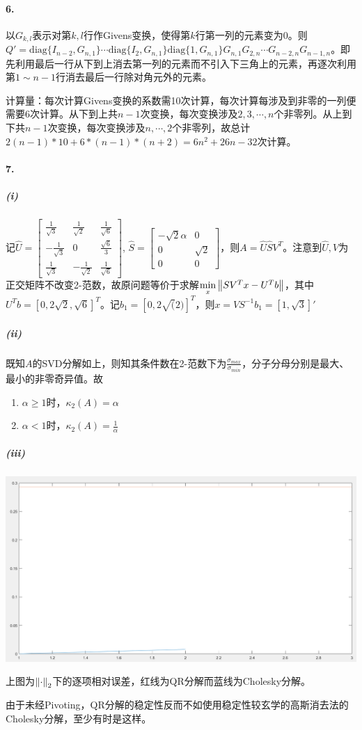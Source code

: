 \documentclass{ctexart}
\begin{document}
\paragraph{6.}
以$G_{k,l}$表示对第$k,l$行作Givens变换，使得第$k$行第一列的元素变为$0$。则$Q'=\mathrm{diag}\{I_{n-2},G_{n,1}\}\cdots\mathrm{diag}\{I_2,G_{n,1}\}\mathrm{diag}\{1,G_{n,1}\}G_{n,1}G_{2,n}\cdots G_{n-2,n}G_{n-1,n}$。即先利用最后一行从下到上消去第一列的元素而不引入下三角上的元素，再逐次利用第$1\sim n-1$行消去最后一行除对角元外的元素。

计算量：每次计算Givens变换的系数需10次计算，每次计算每涉及到非零的一列便需要6次计算。从下到上共$n-1$次变换，每次变换涉及$2,3,\cdots,n$个非零列。从上到下共$n-1$次变换，每次变换涉及$n,\cdots,2$个非零列，故总计$2(n-1)*10+6*(n-1)*(n+2)=6n^2+26n-32$次计算。


\paragraph{7.}
\subparagraph{(i)}
记$\hat{U}=
\begin{bmatrix}
\frac{1}{\sqrt{3}}&\frac{1}{\sqrt{2}}&\frac{1}{\sqrt{6}}\\
-\frac{1}{\sqrt{3}}&0&\frac{\sqrt{6}}{3}\\
\frac{1}{\sqrt{3}}&-\frac{1}{\sqrt{2}}&\frac{1}{\sqrt{6}}\end{bmatrix}$, $\hat{S}=\begin{bmatrix}-\sqrt{2}\alpha&0\\0&\sqrt{2}\\ 0& 0\end{bmatrix}$，则$A=\hat{U}\hat{S}V^T$。注意到$\hat{U},V$为正交矩阵不改变2-范数，故原问题等价于求解$\min\limits_x\left\|SV^Tx-U^Tb\right\|$，其中$U^Tb=[0,2\sqrt{2},\sqrt{6}]^T$。记$b_1=[0,2\sqrt(2)]^T$，则$x=VS^{-1}b_1=[1,\sqrt{3}]'$

\subparagraph{(ii)}
既知$A$的SVD分解如上，则知其条件数在2-范数下为$\frac{\sigma_{max}}{\sigma_{min}}$，分子分母分别是最大、最小的非零奇异值。故
\begin{enumerate}
\item $\alpha\geq 1$时，$\kappa_2(A)=\alpha$
\item $\alpha<1$时，$\kappa_2(A)=\frac{1}{\alpha}$
\end{enumerate}

\subparagraph{(iii)}

\includegraphics[scale=0.5]{2.7.1}

上图为$\left\|\cdot\right\|_2$下的逐项相对误差，红线为QR分解而蓝线为Cholesky分解。

由于未经Pivoting，QR分解的稳定性反而不如使用稳定性较玄学的高斯消去法的Cholesky分解，至少有时是这样。
\end{document}
